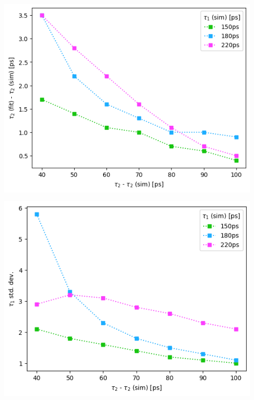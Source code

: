 {\begin{minipage}{.47\linewidth}
    \includegraphics[width=\linewidth]{Batch 3/regular IRF/t2-diff 2080.png}
    \label{fig:comp-t2-2080}
\end{minipage}
\hfill
\begin{minipage}{.47\linewidth}
    \includegraphics[width=\linewidth]{Batch 3/regular IRF/t2-err 2080.png}
    \label{fig:comp-t2err-2080}
\end{minipage}
\begin{minipage}{.47\linewidth}

\end{minipage}}
